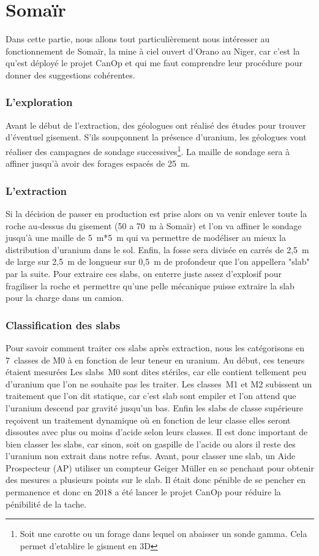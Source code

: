 

\section{Somaïr}
Dans cette partie, nous allons tout particulièrement nous intéresser au fonctionnement de Somaïr, la mine à ciel ouvert d'Orano au Niger, car c'est la qu'est déployé le projet CanOp et qui me faut comprendre leur procédure pour donner des suggestions cohérentes.
\subsubsection{L'exploration}
Avant le début de l'extraction, des géologues ont réalisé des études pour trouver d'éventuel gisement. S'ils soupçonnent la présence d'uranium, les géologues vont réaliser des campagnes de sondage successives\footnote{Soit une carotte ou un forage dans lequel on abaisser un 
sonde gamma. Cela permet d'etablire le gisment en 3D}. La maille de sondage sera à affiner jusqu'à avoir des forages espacés de 25~m. 
\subsubsection{L'extraction}
Si la décision de passer en production est prise alors on va venir enlever toute la roche au-dessus du gisement (50 a 70~m à Somaïr) et l’on va affiner le sondage jusqu'à une maille de 5~m*5~m qui va permettre de modéliser au mieux la distribution d'uranium dans le sol. Enfin, la fosse sera divisée en carrés de 2,5~m de large sur 2,5~m de longueur sur 0,5~m de profondeur que l'on appellera "slab" par la suite. Pour extraire ces slabs, on enterre juste assez d'explosif pour fragiliser la roche et permettre qu'une pelle mécanique puisse extraire la slab pour la charge dans un camion.
\subsubsection{Classification des slabs}
Pour savoir comment traiter ces slabs  après extraction, nous les catégorisons en 7~classes de M0 à  en fonction de leur teneur en uranium. Au début, ces teneurs étaient mesurées  Les slabs~M0 sont dites stériles, car elle contient tellement peu d'uranium que l'on ne souhaite pas les traiter. Les classes~M1 et M2 subissent un traitement que l'on dit statique, car c'est slab sont empiler et l’on attend que l'uranium descend par gravité jusqu'un bas. Enfin les slabs de classe supérieure reçoivent un traitement dynamique où en fonction de leur classe elles seront dissoutes avec plus ou moins d'acide selon leurs classes. Il est donc important de bien classer les slabs, car sinon, soit on gaspille  de l'acide ou alors il reste des l'uranium non extrait dans notre refus.
Avant, pour classer une slab, un Aide Prospecteur (AP) utiliser un compteur Geiger Müller en se penchant pour obtenir des mesures a plusieurs points sur le slab. Il était donc pénible de se pencher en permanence et donc en 2018 a été lancer le projet CanOp pour réduire la pénibilité de la tache.